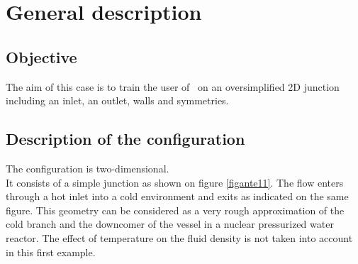 %
%
%
%
%
%
%
\section{General description}


        \subsection{Objective}
The aim of this case is to train the user of \CS\ on an oversimplified 2D junction
including an inlet, an outlet, walls and symmetries.

        \subsection{Description of the configuration}

The configuration is two-dimensional.\\
It consists of a simple junction as shown on figure \ref{figante11}.
The flow enters through a hot inlet into a cold
environment and exits as indicated on the same figure. This geometry can be
considered as a very rough approximation of the cold branch and the downcomer of
the vessel in a nuclear pressurized water reactor. The effect of temperature on
the fluid density is not taken into account in this first example.

